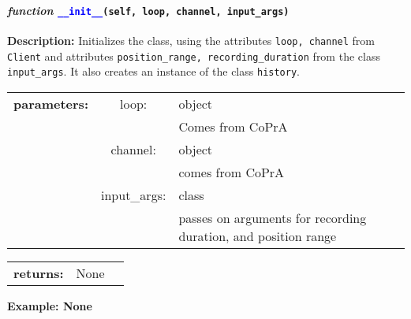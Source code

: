 

\paragraph{\textit{function} \textcolor{blue}{\texttt{\_\_init\_\_}}\texttt{(self, loop, channel, input\_args)}}\hfill\break
\noindent \textbf{Description:} Initializes the class, using the attributes \texttt{loop, channel} from \texttt{Client} and attributes \texttt{position\_range, recording\_duration} from the class \texttt{input\_args}. It also creates an instance of the class \texttt{history}. 

\begin{tabular}{l c l }
	\textbf{parameters:}	& loop: & object\\
	&  & Comes from CoPrA\\
	&channel:& object\\
	&&comes from CoPrA\\
	&input\_args:& class\\
	&& passes on arguments for recording duration, and position range	
\end{tabular}

\begin{tabular}{l c l}
	\textbf{returns:} & None & \\
\end{tabular}

\textbf{Example: None}
%	 	
